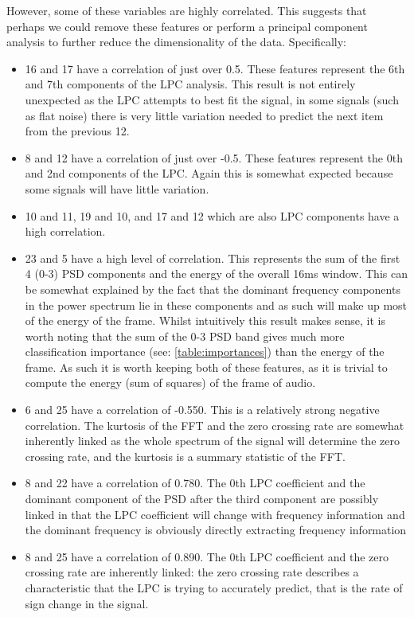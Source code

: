 \documentclass[ %
                    author={Sam Phippen},
                supervisor={Dr. Rafal Bogacz},
                     title={Real time voice activity detectors in noisy personal computing environments},
                  subtitle={},
                    degree={MEng},
                      year={2012} ]{thesis}
\begin{document}
However, some of these variables are highly correlated. This suggests that
perhaps we could remove these features or perform a principal component
analysis to further reduce the dimensionality of the data. Specifically:

\begin{itemize}

    \item 16 and 17 have a correlation of just over 0.5. These features
        represent the 6th and 7th components of the LPC analysis. This result
        is not entirely unexpected as the LPC attempts to best fit the signal,
        in some signals (such as flat noise) there is very little variation
        needed to predict the next item from the previous 12.

    \item 8 and 12 have a correlation of just over -0.5. These features
        represent the 0th and 2nd components of the LPC. Again this is somewhat
        expected because some signals will have little variation.

    \item 10 and 11, 19 and 10, and 17 and 12 which are also LPC components have a high
        correlation.

    \item 23 and 5 have a high level of correlation. This represents the sum of
        the first 4 (0-3) PSD components and the energy of the overall 16ms
        window. This can be somewhat explained by the fact that the dominant
        frequency components in the power spectrum lie in these components and
        as such will make up most of the energy of the frame. Whilst
        intuitively this result makes sense, it is worth noting that the sum of
        the 0-3 PSD band gives much more classification importance (see:
        \ref{table:importances}) than the energy of the frame. As such it is
        worth keeping both of these features, as it is trivial to compute the
        energy (sum of squares) of the frame of audio.

    \item 6 and 25 have a correlation of -0.550. This is a relatively strong
        negative correlation. The kurtosis of the FFT and the zero crossing
        rate are somewhat inherently linked as the whole spectrum of the signal
        will determine the zero crossing rate, and the kurtosis is a summary
        statistic of the FFT.

    \item 8 and 22 have a correlation of 0.780. The 0th LPC coefficient and the
        dominant component of the PSD after the third component are possibly
        linked in that the LPC coefficient will change with frequency
        information and the dominant frequency is obviously directly extracting
        frequency information

    \item 8 and 25 have a correlation of 0.890. The 0th LPC coefficient and the
        zero crossing rate are inherently linked: the zero crossing rate describes
        a characteristic that the LPC is trying to accurately predict, that is the
        rate of sign change in the signal.
\end{itemize}
\end{document}

